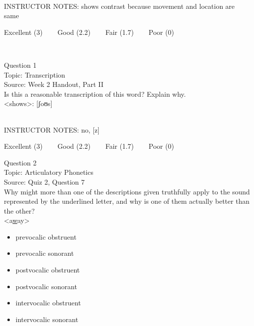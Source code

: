 \documentclass[12pt]{article}
\begin{document}
~\\
INSTRUCTOR NOTES: shows contrast because movement and location are same


\vfill
Excellent (3) ~~~ Good (2.2) ~~~ Fair (1.7) ~~~ Poor (0)
\newpage

\begin{center}
\textbf{{\color{red}{\HUGE END OF EXAM}}}\\

\end{center}
\newpage

\begin{center}
\textbf{{\color{blue}{\HUGE START OF EXAM\\}}}

\textbf{{\color{blue}{\HUGE Student ID: 94263\\}}}

\textbf{{\color{blue}{\HUGE \\}}}

\end{center}
\newpage

{\large Question 1}\\

Topic: Transcription\\
Source: Week 2 Handout, Part II\\

Is this a reasonable transcription of this word? Explain why.\\

<shows>: {[ʃoʊs]}


~\\
INSTRUCTOR NOTES: no, [z]


\vfill
Excellent (3) ~~~ Good (2.2) ~~~ Fair (1.7) ~~~ Poor (0)
\newpage

{\large Question 2}\\

Topic: Articulatory Phonetics\\
Source: Quiz 2, Question 7\\

Why might more than one of the descriptions given truthfully apply to the sound represented by the underlined letter, and why is one of them actually better than the other?\\

<a\underline{w}ay>

\begin{itemize} \item prevocalic obstruent \item prevocalic sonorant \item postvocalic obstruent \item postvocalic sonorant \item intervocalic obstruent \item intervocalic sonorant \end{itemize}
\end{document}
